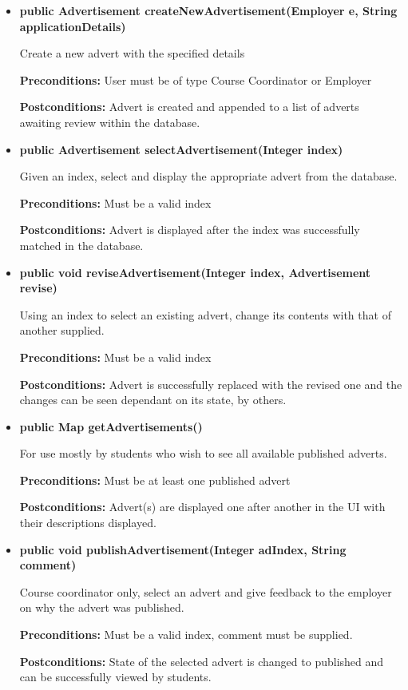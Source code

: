 \documentclass[11pt]{l3deliverable}
\begin{document}
\begin{itemize}

\item{\textbf{public Advertisement createNewAdvertisement(Employer e,
      String applicationDetails)}

Create a new advert with the specified details

\textbf{Preconditions:} User must be of type Course Coordinator or Employer

\textbf{Postconditions:} Advert is created and appended to a list of adverts awaiting 
review within the database.}

\item{\textbf{public Advertisement selectAdvertisement(Integer index)}

Given an index, select and display the appropriate advert from the database.

\textbf{Preconditions:} Must be a valid index

\textbf{Postconditions:} Advert is displayed after the index was successfully matched
in the database.}

\item{\textbf{public void reviseAdvertisement(Integer index, Advertisement revise)}

Using an index to select an existing advert, change its contents with that of another supplied.

\textbf{Preconditions:} Must be a valid index

\textbf{Postconditions:} Advert is successfully replaced with the revised one and the changes
can be seen dependant on its state, by others.}

\item{\textbf{public Map getAdvertisements()}

For use mostly by students who wish to see all available published adverts.

\textbf{Preconditions:} Must be at least one published advert

\textbf{Postconditions:} Advert(s) are displayed one after another in the UI with their
descriptions displayed.}

\item{\textbf{public void publishAdvertisement(Integer adIndex, String comment)}

Course coordinator only, select an advert and give feedback to the employer on why the advert was published.

\textbf{Preconditions:} Must be a valid index, comment must be supplied.

\textbf{Postconditions:} State of the selected advert is changed to published and can be
successfully viewed by students.}

\end{itemize}
\newpage
\end{document}
